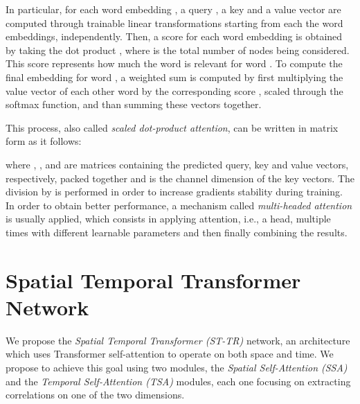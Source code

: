 \documentclass[review]{cvpr}
\begin{document}
In particular, for each word embedding , a query , a key  and a value vector  are computed through trainable linear transformations starting from each the word embeddings, independently. Then, a score for each word embedding is obtained by taking the dot product  , where  is the total number of nodes being considered. This score represents how much the word  is relevant for word . To compute the final embedding for word , a weighted sum is computed by first multiplying the value vector of each other word  by the corresponding score , scaled through the softmax function, and than summing these vectors together. 

This process, also called \textit{scaled dot-product attention}, can be written in matrix form as it follows:



where , , and  are matrices containing the predicted query, key and value vectors, respectively, packed together and  is the channel dimension of the key vectors. The division by  is performed in order to increase gradients stability during training. In order to obtain better performance, a mechanism called \textit{multi-headed attention} is usually applied, which consists in applying attention, i.e., a head, multiple times with different learnable parameters and then finally combining the results.





\section{Spatial Temporal Transformer Network}

We propose the \textit{Spatial Temporal Transformer (ST-TR)} network, an architecture which uses Transformer self-attention to operate on both space and time. We propose to achieve this goal using two modules, the \textit{Spatial Self-Attention (SSA)} and the \textit{Temporal Self-Attention (TSA)} modules, each one focusing on extracting correlations on one of the two dimensions. 
\end{document}
